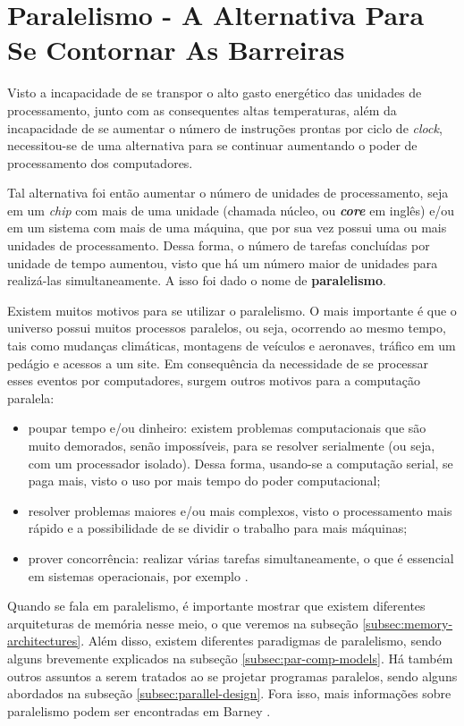 \section{Paralelismo - A Alternativa Para Se Contornar As Barreiras}

\label{sec:parallelism}

Visto a incapacidade de se transpor o alto gasto energético das
unidades de processamento, junto com as consequentes altas temperaturas,
além da incapacidade de se aumentar o número de instruções prontas por
ciclo de \textit{clock}, necessitou-se de uma alternativa para se continuar
aumentando o poder de processamento dos computadores.

Tal alternativa foi então aumentar o número de unidades de processamento,
seja em um \textit{chip} com mais de uma unidade (chamada núcleo, ou
\textbf{\textit{core}} em inglês) e/ou em um sistema com mais de uma
máquina, que por sua vez possui uma ou mais unidades de processamento.
Dessa forma, o número de tarefas concluídas por unidade de tempo aumentou,
visto que há um número maior de unidades para realizá-las simultaneamente.
A isso foi dado o nome de \textbf{paralelismo}.

Existem muitos motivos para se utilizar o paralelismo. O mais importante é
que o universo possui muitos processos paralelos, ou seja, ocorrendo ao
mesmo tempo, tais como mudanças climáticas, montagens de veículos e
aeronaves, tráfico em um pedágio e acessos a um site. Em consequência da
necessidade de se processar esses eventos por computadores, surgem outros 
motivos para a computação paralela:
\begin{itemize}
	\item poupar tempo e/ou dinheiro: existem problemas computacionais
	      que são muito demorados, senão impossíveis, para se resolver
	      serialmente (ou seja, com um processador isolado). Dessa forma, 
	      usando-se a computação serial, se paga mais,
	      visto o uso por mais tempo do poder computacional;
	\item resolver problemas maiores e/ou mais complexos, visto o
	      processamento mais rápido e a possibilidade de se dividir o trabalho
	      para mais máquinas;
	\item prover concorrência: realizar várias tarefas simultaneamente, o que é 
	      essencial em sistemas operacionais, por exemplo \cite{LLNL:parcomp}.
\end{itemize}

Quando se fala em paralelismo, é importante mostrar que existem diferentes
arquiteturas de memória nesse meio, o que veremos na subseção
\ref{subsec:memory-architectures}. Além disso, existem diferentes
paradigmas de paralelismo, sendo alguns brevemente explicados na subseção
\ref{subsec:par-comp-models}. Há também outros assuntos a serem tratados
ao se projetar programas paralelos, sendo alguns abordados na subseção
\ref{subsec:parallel-design}. Fora isso, mais informações sobre
paralelismo podem ser encontradas em Barney \cite{LLNL:parcomp}.

